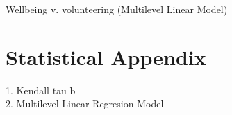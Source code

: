 \documentclass[10pt, letterpaper]{article}
\begin{document}
\begin{spacing}{1.4}
\begin{spacing}{.9}
\begin{spacing}{.9}
\begin{table}[H]
\centering 
\caption{Wellbeing v. volunteering (Multilevel Linear Model)}  
\begin{scriptsize} 
	 
      \label{regB} 
\end{scriptsize}
\end{table}
\end{spacing}

\section{Statistical Appendix}

1. Kendall tau b \\
2. Multilevel Linear Regresion Model

\end{spacing}
\end{spacing}
\end{document}
